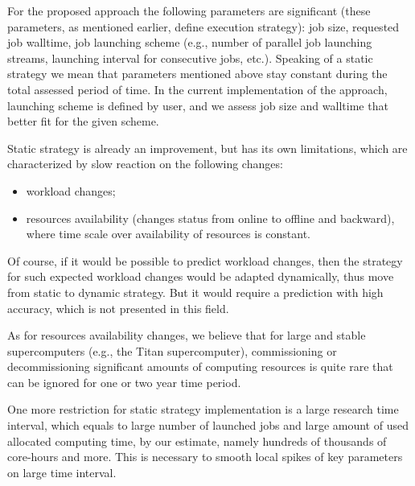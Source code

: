 For the proposed approach the following parameters are significant (these
parameters, as mentioned earlier, define execution strategy): job size,
requested job walltime, job launching scheme (e.g., number of parallel job
launching streams, launching interval for consecutive jobs, etc.). Speaking
of a static strategy we mean that parameters mentioned above stay constant
during the total assessed period of time. In the current implementation of
the approach, launching scheme is defined by user, and we assess job size
and walltime that better fit for the given scheme.

Static strategy is already an improvement, but has its own limitations,
which are characterized by slow reaction on the following changes:
\begin{itemize}
    \item workload changes;
    \item resources availability (changes status from online to offline and
    backward), where time scale over availability of resources is constant.
\end{itemize}

Of course, if it would be possible to predict workload changes, then the
strategy for such expected workload changes would be adapted dynamically,
thus move from static to dynamic strategy. But it would require a prediction
with high accuracy, which is not presented in this field.

As for resources availability changes, we believe that for large and stable
supercomputers (e.g., the Titan supercomputer), commissioning or
decommissioning significant amounts of computing resources is quite rare
that can be ignored for one or two year time period.

One more restriction for static strategy implementation is a large research
time interval, which equals to large number of launched jobs and large
amount of used allocated computing time, by our estimate, namely hundreds of
thousands of core-hours and more. This is necessary to smooth local spikes
of key parameters on large time interval.


